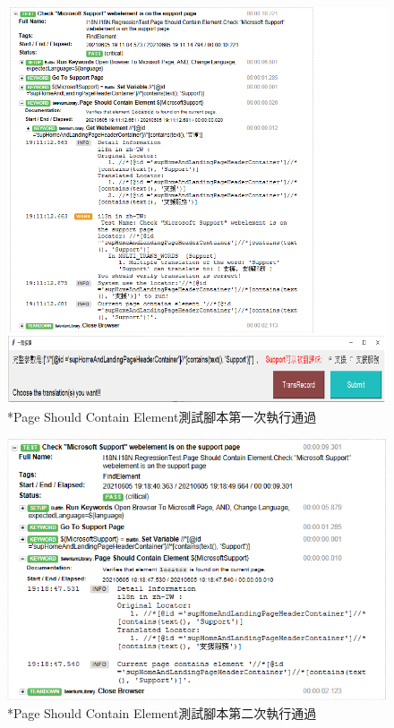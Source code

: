 \begin{figure}[H]
\centering
\includegraphics[width= .8\textwidth]{../論文截圖/4.1.5-2 page should contain element 1st run.png}
\caption{*Page Should Contain Element測試腳本第一次執行通過}
\end{figure}
\begin{figure}[H]
\centering
\includegraphics[width= \textwidth]{../論文截圖/4.1.5-3 page should contain element 2nd run.png}
\caption{*Page Should Contain Element測試腳本第二次執行通過}
\end{figure}

\hspace*{\fill} \\
\\ \hspace*{\fill} \\
\\ \hspace*{\fill} \\
\\ \hspace*{\fill} \\
\\ \hspace*{\fill} \\
